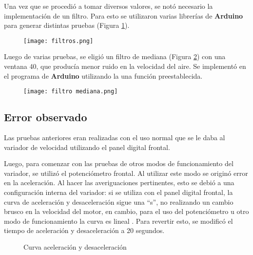 Una vez que se procedió a tomar diversos valores, se notó necesario la implementación de un filtro. Para esto se utilizaron varias librerías de \textbf{Arduino} para generar distintas pruebas (Figura \ref{fig:filtros}).

\begin{figure}[!h]
	\centering
	\texttt{[image: filtros.png]}
	\label{fig:filtros}
\end{figure}

Luego de varias pruebas, se eligió un filtro de mediana (Figura \ref{fig:filtrosm}) con una ventana 40, que producía menor ruido en la velocidad del aire. Se implementó en el programa de \textbf{Arduino} utilizando la una función preestablecida.

\begin{figure}[htb]
	\centering
	\texttt{[image: filtro mediana.png]}
	\label{fig:filtrosm}
\end{figure}


\subsection{Error observado}
Las pruebas anteriores eran realizadas con el uso normal que se le daba al variador de velocidad utilizando el panel digital frontal.

Luego, para comenzar con las pruebas de otros modos de funcionamiento del variador, se utilizó el potenciómetro frontal. Al utilizar este modo se originó error en la aceleración.   Al hacer las averiguaciones pertinentes, esto se debió a una configuración interna del variador: si se utiliza con el panel digital frontal, la curva de aceleración y desaceleración sigue una “s”, no realizando un cambio brusco en la velocidad del motor, en cambio, para el uso del potenciómetro u otro modo de funcionamiento la curva es lineal . Para revertir esto, se modificó el tiempo de aceleración y desaceleración a 20 segundos.

\begin{figure}[htbp]
	\centering
	\caption{Curva aceleración y desaceleración} \label{fig:curva}
\end{figure}

\newpage